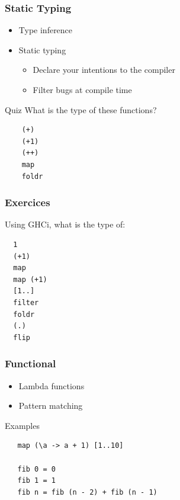 \documentclass{beamer}
\begin{document}
\begin{frame}[fragile]
\frametitle{Static Typing}

 \begin{itemize}
  \item Type inference
  \item Static typing
   \begin{itemize}
    \item Declare your intentions to the compiler
    \item Filter bugs at compile time
   \end{itemize}
 \end{itemize}
 
 \vspace{0.5cm}
 \begin{block}{Quiz}
  What is the type of these functions?
  \begin{lstlisting}
    (+)
    (+1)
    (++)
    map
    foldr
  \end{lstlisting}
 \end{block}

\end{frame}

\begin{frame}[fragile]
\frametitle{Exercices}

 Using GHCi, what is the type of:
 \begin{lstlisting}
  1
  (+1)
  map 
  map (+1)
  [1..]
  filter
  foldr
  (.)
  flip
 \end{lstlisting}
 
\end{frame}


\begin{frame}[fragile]
\frametitle{Functional}
 
 \begin{itemize}
  \item Lambda functions
  \item Pattern matching	  
 \end{itemize}

 \vspace{0.5cm}
 \begin{block}{Examples}

  \begin{lstlisting} 
   map (\a -> a + 1) [1..10]
  
   fib 0 = 0
   fib 1 = 1
   fib n = fib (n - 2) + fib (n - 1)
  
  \end{lstlisting}
 \end{block}

\end{frame}
\end{document}
